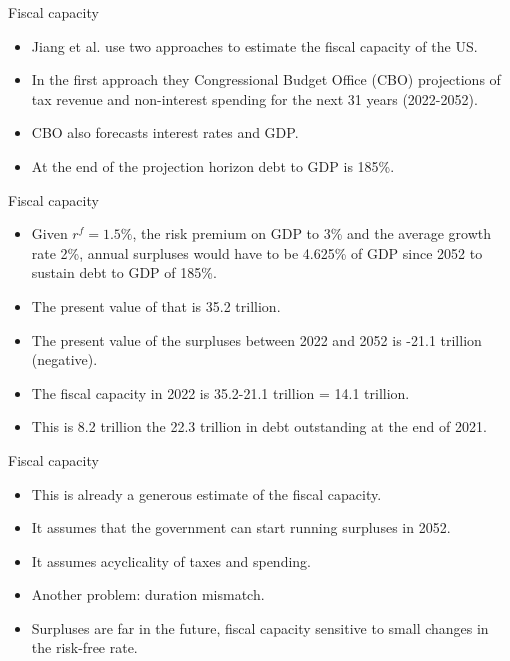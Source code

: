 \documentclass[11pt,xcolor={dvipsnames},aspectratio=159,hyperref={pdftex,pdfpagemode=UseNone,hidelinks,pdfdisplaydoctitle=true},usepdftitle=false]{beamer}
\begin{document}
 

   \begin{frame}{Fiscal capacity}
    \begin{itemize}
        \item Jiang et al. use two approaches to estimate the fiscal capacity of the US. 
        \item In the first approach they Congressional Budget Office (CBO) projections of tax revenue and non-interest spending for the next 31 years (2022-2052).
        \item CBO also forecasts interest rates and GDP.
        \item At the end of the projection horizon debt to GDP is 185\%.
    \end{itemize}
   \end{frame}   

   \begin{frame}{Fiscal capacity}
    \begin{itemize}
        \item Given $r^f = 1.5\%$, the risk premium on GDP to 3\% and the average growth rate 2\%, annual surpluses would have to be 4.625\% of GDP since 2052 to sustain debt to GDP of 185\%.
        \item The present value of that is 35.2 trillion.
        \item The present value of the surpluses between 2022 and 2052 is -21.1 trillion (negative).
        \item The fiscal capacity in 2022 is 35.2-21.1 trillion = 14.1 trillion.
        \item This is 8.2 trillion  the 22.3 trillion in debt outstanding at the end of 2021.
    \end{itemize}
   \end{frame}  

   \begin{frame}{Fiscal capacity}
    \begin{itemize}
        \item This is already a generous estimate of the fiscal capacity.
        \item It assumes that the government can start running surpluses in 2052.
        \item It assumes acyclicality of taxes and spending.
        \item Another problem: duration mismatch.
        \item Surpluses are far in the future, fiscal capacity sensitive to small changes in the risk-free rate. 
    \end{itemize}
   \end{frame}    
\end{document}
